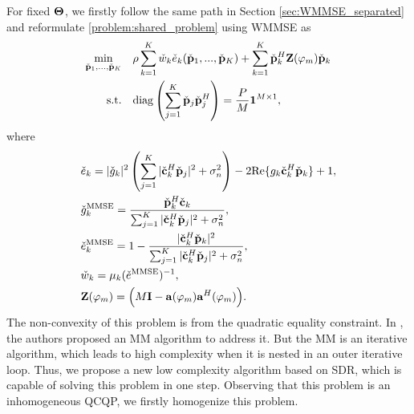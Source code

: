 For fixed ${\bf \Theta}$, we firstly follow the same path in Section \ref{sec:WMMSE_separated} and reformulate \eqref{problem:shared_problem} using WMMSE as
\begin{subequations} \label{problem:shared_mse_minimization}
    \begin{align} 
        \min_{\check{\bf p}_1,...,\check{\bf p}_K} \quad &\rho \sum_{k=1}^K \check{w}_k \check{e}_k(\check{\bf p}_1,...,\check{\bf p}_K) +  \sum_{k=1}^K \check{\bf p}_k^H {\bf Z}(\varphi_m) \check{\bf p}_k  
        \\ \mathrm{s.t.} \quad &\mathrm{diag}\left( \sum_{j=1}^K \check{\bf p}_j \check{\bf p}_j^H \right) = \frac{P}{M} {\bf 1}^{M \times 1}, 
    \end{align}
\end{subequations}
where
\begin{align} 
    &\check{e}_k = |\check{g}_k|^2 \left( \sum_{j=1}^K |\check{\bf c}_k^H \check{\bf p}_j|^2 + \sigma_n^2 \right) - 2\mathrm{Re}\{ g_k \check{\bf c}_k^H \check{\bf p}_k\} + 1, \\
    \label{eqn:shared_mmse_receiver}
    &\check{g}_k^{\mathrm {MMSE}} = \frac{\check{\bf p}_k^H \check{\bf c}_k}{\sum_{j=1}^K |\check{\bf c}_k^H \check{\bf p}_j|^2 + \sigma_n^2},\\
    &\check{e}_k^{\mathrm{MMSE}} = 1-\frac{|\check{\bf c}_k^H \check{\bf p}_k|^2}{\sum_{j=1}^K |\check{\bf c}_k^H \check{\bf p}_j|^2 + \sigma_n^2},\\
    \label{eqn:shared_wmmse_weight}
    &\check{w}_k = \mu_k (\check{e}^{\mathrm{MMSE}})^{-1}, \\
    & {\bf Z}(\varphi_m) = \Big( M{\bf I} - {\bf a}(\varphi_m){\bf a}^H(\varphi_m) \Big).
\end{align}
The non-convexity of this problem is from the quadratic equality constraint. In \cite{xu2020tradeoff}, the authors proposed an MM algorithm to address it.
But the MM is an iterative algorithm, which leads to high complexity when it is nested in an outer iterative loop.
Thus, we propose a new low complexity algorithm based on SDR, which is capable of solving this problem in one step.   
Observing that this problem is an inhomogeneous QCQP, we firstly homogenize this problem.

